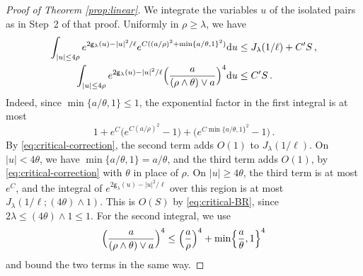 \documentclass[a4paper,10pt,leqno]{amsart}
\numberwithin{equation}{section}
\newcommand{\dd}{\mathrm{d}}
\def\g{\mathsf{g}}
\begin{document}
\begin{proof}[Proof of Theorem \ref{prop:linear}]
  We integrate the variables $u$ of the isolated pairs as in Step~2 of that proof. Uniformly in $\rho\ge\lambda$, we have
  \begin{align*}
    \int_{|u|\le4\rho}e^{2\g_\lambda(u)-|u|^2/\ell}
    e^{C((a/\rho)^2+\min\{a/\theta,1\}^2)}\dd u&\le J_\lambda(1/\ell)+C'S\,,\\
    \int_{|u|\le4\rho}e^{2\g_\lambda(u)-|u|^2/\ell}
    \Bigl(\frac a{(\rho\wedge\theta)\vee a}\Bigr)^4\dd u&\le C'S\,.
  \end{align*}
  Indeed, since $\min\{a/\theta,1\}\le1$, the exponential factor in the first integral is at most
  \[
    1+e^C\bigl(e^{C(a/\rho)^2}-1\bigr)+\bigl(e^{C\min\{a/\theta,1\}^2}-1\bigr)\,.
  \]
  By \eqref{eq:critical-correction}, the second term adds $O(1)$ to $J_\lambda(1/\ell)$. On $|u|<4\theta$, we have $\min\{a/\theta,1\}=a/\theta$, and the third term adds $O(1)$, by \eqref{eq:critical-correction} with $\theta$ in place of $\rho$. On $|u|\ge4\theta$, the third term is at most $e^C$, and the integral of $e^{2\g_\lambda(u)-|u|^2/\ell}$ over this region is at most $J_\lambda(1/\ell;(4\theta)\wedge1)$. This is $O(S)$ by \eqref{eq:critical-BR}, since $2\lambda\le(4\theta)\wedge1\le1$. For the second integral, we use
  \[
    \Bigl(\frac a{(\rho\wedge\theta)\vee a}\Bigr)^4\le\Bigl(\frac a\rho\Bigr)^4+\min\Bigl\{\frac a\theta,1\Bigr\}^4
  \]
  and bound the two terms in the same way.


\end{proof}
\end{document}
